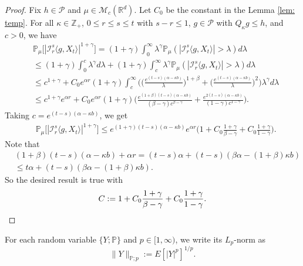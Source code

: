 \documentclass[12pt,a4paper]{amsart}
\theoremstyle{plain}
\theoremstyle{definition}
\numberwithin{equation}{section}
\begin{document}
\begin{proof}
    Fix $h \in \mathcal P$ and $\mu \in \mathcal M_c(\mathbb R^d)$. Let $C_0$ be the constant in the Lemma \ref{lem: temp}.
    For all $\kappa \in \mathbb Z_+$,  $0\leq r\leq s\leq t$ with $s-r \leq 1$,  $g\in \mathcal P$ with $Q_{\kappa} g \leq h$, and $c>0$, we have
\begin{align}
    &\mathbb P_\mu\big[|\mathcal I_r^s\langle g, X_t\rangle|^{1+\gamma}\big]
    = (1+\gamma)\int_0^\infty \lambda^{\gamma} \mathbb P_{\mu}(|\mathcal I_r^s\langle g, X_t\rangle|>\lambda) d\lambda
    \\&\leq (1+\gamma)\int_0^c \lambda^{\gamma} d\lambda +(1+\gamma)\int_c^\infty \lambda^{\gamma}\mathbb P_\mu(|\mathcal I_r^s\langle g, X_t\rangle|> \lambda) d\lambda
    \\& \leq c^{1+\gamma} + C_0  e^{\alpha r}(1+\gamma)\int_c^\infty \bigg(\Big(\frac{e^{(t-s)(\alpha - \kappa b)}}{\lambda}\Big)^{1+\beta}+\Big(\frac{e^{(t-s)(\alpha - \kappa b)}}{\lambda}\Big)^{2}\bigg)\lambda^{\gamma}d\lambda
    \\&\leq c^{1+\gamma} e^{\alpha r} + C_0e^{\alpha r}(1+\gamma)\Big(  \frac{e^{(1+\beta)(t-s)(\alpha- \kappa b)}}{(\beta - \gamma)c^{\beta - \gamma}}  + \frac{e^{2(t-s)(\alpha- \kappa b)}}{(1 - \gamma)c^{1 - \gamma}} \Big).
\end{align}
    Taking $c = e^{(t-s)(\alpha- \kappa b)}$, we get
\begin{align}
    &\mathbb P_\mu\big[|\mathcal I_r^s\langle g, X_t\rangle|^{1+\gamma}\big]
    \leq e^{(1+\gamma)(t-s)(\alpha- \kappa b)} e^{\alpha r}\Big(1+ C_0 \frac{1+\gamma}{\beta - \gamma}+ C_0 \frac{1+\gamma}{1 - \gamma}\Big).
\end{align}
    Note that
\begin{align}
    &(1+\beta)(t-s)(\alpha- \kappa b) + \alpha r
    = (t-s)\alpha+(t-s) (\beta\alpha- (1+\beta)\kappa b)
    \\&\leq t\alpha+(t-s) (\beta\alpha- (1+\beta)\kappa b).
\end{align}
    So the desired result is true with
\[
    C
    := 1+ C_0 \frac{1+\gamma}{\beta - \gamma}+ C_0 \frac{1+\gamma}{1 - \gamma}.
    \qedhere
\]
\end{proof}
    For each random variable $\{Y; \mathbb P\}$ and $p \in [1,\infty)$, we write its $L_p$-norm as
\[
    \|Y\|_{\mathbb P;p}:= E[|Y|^p]^{1/p}.
\]
\end{document}
